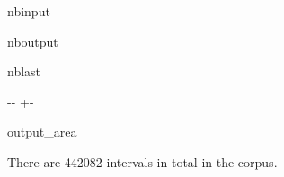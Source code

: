 \documentclass[letterpaper,10pt,english]{sphinxmanual}
\newlength\nbsphinxcodecellspacing
\begin{document}
\begin{sphinxuseclass}{nbinput}
{
\begin{sphinxVerbatim}[commandchars=\\\{\}]
\llap{\color{nbsphinxin}[50]:\,\hspace{\fboxrule}\hspace{\fboxsep}}
\end{sphinxVerbatim}
}

\end{sphinxuseclass}
\begin{sphinxuseclass}{nboutput}
\begin{sphinxuseclass}{nblast}
{

\kern-\sphinxverbatimsmallskipamount\kern-\baselineskip
\kern+\FrameHeightAdjust\kern-\fboxrule
\vspace{\nbsphinxcodecellspacing}

\begin{sphinxuseclass}{output_area}
\begin{sphinxuseclass}{}


\begin{sphinxVerbatim}[commandchars=\\\{\}]
There are 442082 intervals in total in the corpus.
\end{sphinxVerbatim}



\end{sphinxuseclass}
\end{sphinxuseclass}
}

\end{sphinxuseclass}
\end{sphinxuseclass}
\end{document}
